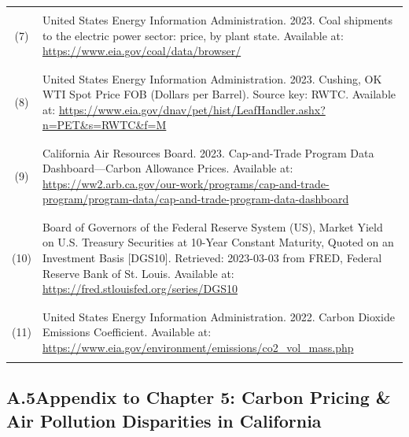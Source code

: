 \begin{center}
\begin{longtable}{c L{0.8\textwidth}}
        \hline \\[-3ex]
        (7) & United States Energy Information Administration. 2023. Coal shipments to the electric power sector: price, by plant state. Available at: \url{https://www.eia.gov/coal/data/browser/} \\ \\[-3ex]
        \hline \\[-3ex]
        (8) & United States Energy Information Administration. 2023. Cushing, OK WTI Spot Price FOB (Dollars per Barrel). Source key: RWTC. Available at: \url{https://www.eia.gov/dnav/pet/hist/LeafHandler.ashx?n=PET&s=RWTC&f=M} \\ \\[-3ex]
        \hline \\[-3ex]
        (9) & California Air Resources Board. 2023. Cap-and-Trade Program Data Dashboard---Carbon Allowance Prices. Available at: \url{https://ww2.arb.ca.gov/our-work/programs/cap-and-trade-program/program-data/cap-and-trade-program-data-dashboard} \\ \\[-3ex]
        \hline \\[-3ex]
        (10) & Board of Governors of the Federal Reserve System (US), Market Yield on U.S. Treasury Securities at 10-Year Constant Maturity, Quoted on an Investment Basis [DGS10]. Retrieved: 2023-03-03 from FRED, Federal Reserve Bank of St. Louis. Available at: \url{https://fred.stlouisfed.org/series/DGS10} \\ \\[-3ex]
        \hline \\[-3ex]
        (11) & United States Energy Information Administration. 2022. Carbon Dioxide Emissions Coefficient. Available at: \url{https://www.eia.gov/environment/emissions/co2_vol_mass.php}\\ \\[-3ex]
        \hline\hline
    \end{longtable}
\end{center}

\newpage
\subsection*{A.5\quad Appendix to Chapter 5: Carbon Pricing \& Air Pollution Disparities in California}
